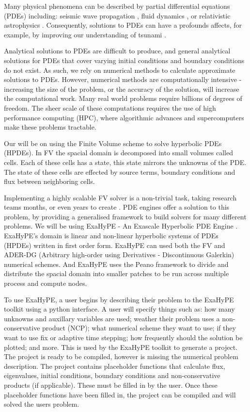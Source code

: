 Many physical phenomena can be described by partial differential equations (PDEs) including:  seismic wave propagation \cite{earthquakePDE}, fluid dynamics \cite{exahype}, or relativistic astrophysics \cite{relativisticPDE}.
Consequently, solutions to PDEs can have a profounds affects, for example, by improving our understanding of tsunami \cite{tsunamiPDE}.


Analytical solutions to PDEs are difficult to produce, and general analytical solutions for PDEs that cover varying initial conditions and boundary conditions do not exist.
As such, we rely on numerical methods to calculate approximate solutions to PDEs.
However, numerical methods are computationally intensive - increasing the size of the problem, or the accuracy of the solution, will increase the computational work.
Many real world problems require billions of degrees of freedom.
The sheer scale of these computations requires the use of high performance computing (HPC), where algorithmic advances and supercomputers make these problems tractable.

Our will be on using the Finite Volume scheme to solve hyperbolic PDEs (HPDEs).
In FV the spacial domain is decomposed into small volumes called cells.
Each of these cells has a state, this state mirrors the unknowns of the PDE.
The state of these cells are effected by source terms, boundary conditions and flux between neighboring cells.




Implementing a highly scalable FV solver is a non-trivial task, taking research teams months, or even years to create \cite{tensorChemistry}.
PDE engines offer a solution to this problem, by providing a generalised framework to build solvers for many different problems.
We will be using ExaHyPE - An Exascale Hyperbolic PDE Engine \cite{exahype}.
ExaHyPE's domain is linear and non-linear hyperbolic systems of PDEs (HPDEs) written in first order form. 
ExaHyPE can used both the FV and ADER-DG (Arbitrary high-order using Derivatives - Discontinuous Galerkin) numerical schemes.
And ExaHyPE uses the Peano framework \cite{PeanoFramework} to divide and distribute the spacial domain into smaller patches to be run across multiple process and compute nodes.

To use ExaHyPE, a user begins by describing their problem to the ExaHyPE toolkit using a python interface.
A user will specify things such as: how many unknowns and auxillary variables are used; weather their problem uses a non-conservative product (NCP); what numerical scheme they want to use; if they want to use fix or adaptive time stepping; how frequently should the solution be plotted; and more.
This is used by the ExaHyPE toolkit to generate a project.
The project is ready to be compiled, however is missing the numerical problem description.
The project contains placeholder functions that calculate flux, eigenvalues, initial conditions, boundary conditions and non-conservative products (if applicable).   
These must be filled in by the user.
Once these placeholder functions have been filled in, the project can be compiled and will solved the users problem.


